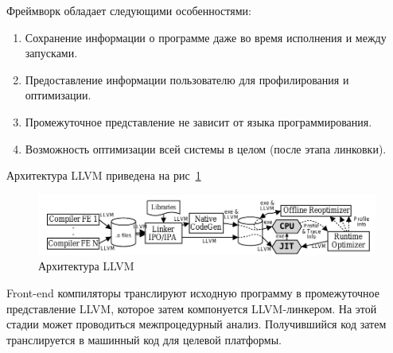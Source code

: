 Фреймворк обладает следующими особенностями:

\begin{enumerate}
    \item Сохранение информации о программе даже во время исполнения и между
    запусками.
    \item Предоставление информации пользователю для профилирования и
    оптимизации.
    \item Промежуточное представление не зависит от языка программирования.
    \item Возможность оптимизации всей системы в целом (после этапа линковки).
\end{enumerate}

Архитектура LLVM приведена на рис~\ref{fig:llvm_arch}

\begin{figure}[h!]
    \begin{center}
        \includegraphics[width=\textwidth]{img/llvm_arch.png}
    \end{center}
    \caption{Архитектура LLVM}
    \label{fig:llvm_arch}
\end{figure}

Front-end компиляторы транслируют исходную программу в промежуточное
представление LLVM, которое затем компонуется LLVM-линкером. На этой стадии
может проводиться межпроцедурный анализ. Получившийся код затем транслируется
в машинный код для целевой платформы.
